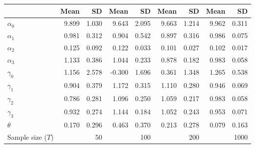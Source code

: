 
\begin{tabular}[t]{lrrrrrrrr}
\toprule
  & Mean & SD & Mean  & SD  & Mean   & SD   & Mean    & SD   \\
\midrule
$\alpha_{0}$ & 9.899 & 1.030 & 9.643 & 2.095 & 9.663 & 1.214 & 9.962 & 0.311\\
$\alpha_{1}$ & 0.981 & 0.312 & 0.904 & 0.542 & 0.897 & 0.316 & 0.986 & 0.075\\
$\alpha_{2}$ & 0.125 & 0.092 & 0.122 & 0.033 & 0.101 & 0.027 & 0.102 & 0.017\\
$\alpha_{3}$ & 1.133 & 0.386 & 1.044 & 0.233 & 0.878 & 0.182 & 0.983 & 0.058\\
$\gamma_{0}$ & 1.156 & 2.578 & -0.300 & 1.696 & 0.361 & 1.348 & 1.265 & 0.538\\
$\gamma_{1}$ & 0.904 & 0.379 & 1.172 & 0.315 & 1.110 & 0.280 & 0.946 & 0.069\\
$\gamma_{2}$ & 0.786 & 0.281 & 1.096 & 0.250 & 1.059 & 0.217 & 0.983 & 0.058\\
$\gamma_{3}$ & 0.932 & 0.274 & 1.144 & 0.184 & 1.052 & 0.243 & 0.953 & 0.071\\
$\theta$ & 0.170 & 0.296 & 0.463 & 0.370 & 0.213 & 0.278 & 0.079 & 0.163\\
Sample size ($T$) &  & 50 &  & 100 &  & 200 &  & 1000\\
\bottomrule
\end{tabular}
